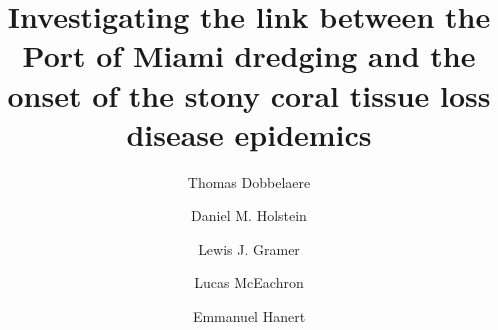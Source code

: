 \documentclass[preprint,12pt,authoryear]{elsarticle}
\begin{document}
\begin{frontmatter}



    \title{Investigating the link between the Port of Miami dredging and the onset of the stony coral tissue loss disease epidemics}
%
%
%

    \author[eli]{Thomas Dobbelaere}
    \author[lsu]{Daniel M. Holstein}
    \author[cimas,aoml]{Lewis J. Gramer}
    \author[fwc]{Lucas McEachron}
    \author[eli,immc]{Emmanuel Hanert}


\end{frontmatter}
\end{document}
